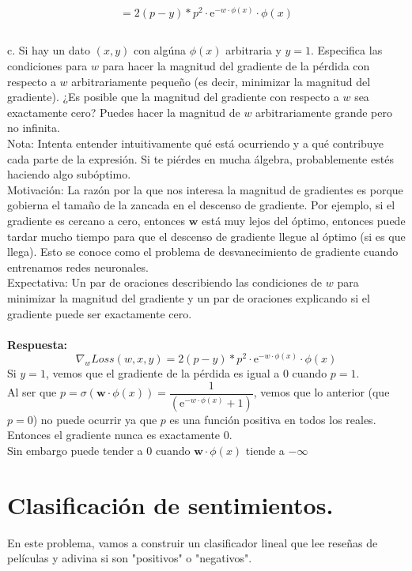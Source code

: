 \documentclass{article}
\begin{document}
\[=2(p-y)*p^2\cdot \mathrm{e}^{-w\cdot \phi(x)} \cdot \phi(x) \]

\subsection{}
c. Si hay un dato $(x, y)$ con algúna $\phi(x)$ arbitraria y $y=1$. Especifica las condiciones para $w$ para hacer la magnitud del gradiente de la pérdida con respecto a $w$ arbitrariamente pequeño (es decir, minimizar la magnitud del gradiente). ¿Es posible que la magnitud del gradiente con respecto a $w$ sea exactamente cero? Puedes hacer la magnitud de $w$ arbitrariamente grande pero no infinita.\\
Nota: Intenta entender intuitivamente qué está ocurriendo y a qué contribuye cada parte de la expresión. Si te piérdes en mucha álgebra, probablemente estés haciendo algo subóptimo.\\

Motivación: La razón por la que nos interesa la magnitud de gradientes es porque gobierna el tamaño de la zancada en el descenso de gradiente. Por ejemplo, si el gradiente es cercano a cero, entonces $\boldsymbol{w}$ está muy lejos del óptimo, entonces puede tardar mucho tiempo para que el descenso de gradiente llegue al óptimo (si es que llega). Esto se conoce como el problema de desvanecimiento de gradiente cuando entrenamos redes neuronales.\\

Expectativa: Un par de oraciones describiendo las condiciones de $w$ para minimizar la magnitud del gradiente y un par de oraciones explicando si el gradiente puede ser exactamente cero.\\
\\\textbf{Respuesta:}\\
\[\nabla_w Loss(w,x,y)=2(p-y)*p^2\cdot \mathrm{e}^{-w\cdot \phi(x)} \cdot \phi(x) \]
Si $y=1$, vemos que el gradiente de la pérdida es igual a 0 cuando $p =1$.\\
Al ser que $p=\sigma(\boldsymbol{w} \cdot \phi(x))= \dfrac{1}{\left(\mathrm{e}^{-w\cdot \phi(x)}+1\right)}$, vemos que lo anterior (que $p = 0$) no puede ocurrir ya que $p$ es una función positiva en todos los reales. Entonces el gradiente nunca es exactamente 0.\\
Sin embargo puede tender a 0 cuando $\boldsymbol{w} \cdot \phi(x)$ tiende a $-\infty$




\section{Clasificación de sentimientos.}
 En este problema, vamos a construir un clasificador lineal que lee reseñas de películas y adivina si son "positivos" o "negativos".
 
\end{document}
